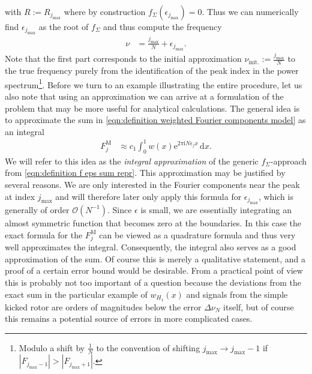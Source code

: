 \documentclass[english, parskip=full]{scrartcl}     %
\newcommand{\intx}{}
\newcommand{\tecxt}{}
\renewcommand{\i}{\text{i}}
\newcommand{\e}{\text{e}}
\begin{document}
with $R := R_{j_\tecxt\text{max}}$ where by construction $f_\Sigma(\epsilon_{j_\tecxt\text{max}}) = 0$. 
Thus we can numerically find $\epsilon_{j_\tecxt\text{max}}$ as the root of $f_\Sigma$ and thus compute the frequency
\begin{align}
\nu &= \frac{j_\tecxt\text{max}}{N} + \epsilon_{j_\tecxt\text{max}}.
\end{align}
Note that the first part corresponds to the initial approximation $\nu_\tecxt\text{init.} := \frac{j_\tecxt\text{max}}{N}$ to the true frequency purely from the identification of the peak index in the power spectrum\footnote{Modulo a shift by $\frac{1}{N}$ to the convention of shifting $j_\tecxt\text{max} \rightarrow j_\tecxt\text{max} - 1$ if $|F_{j_\tecxt\text{max} - 1}| > |F_{j_\tecxt\text{max} + 1}|$.}.
Before we turn to an example illustrating the entire procedure, let us also note that using an approximation we can arrive at a formulation of the problem that may be more useful for analytical calculations.
The general idea is to approximate the sum in \autoref{eqn:definition weighted Fourier components model} as an integral
\begin{align}
F_j^\tecxt\text{M} &\approx c_1 \intx\int_{0}^{1} w(x) \e^{2\pi\i N\epsilon_j x} \, \mathrm{d}x. \label{eqn:definition weighted Fourier components model integral approx}
\end{align}
We will refer to this idea as the \emph{integral approximation} of the generic $f_\Sigma$-approach from \autoref{eqn:definition f eps sum repr}.
This approximation may be justified by several reasons.
We are only interested in the Fourier components near the peak at index $j_\tecxt\text{max}$ and will therefore later only apply this formula for $\epsilon_{j_\tecxt\text{max}}$, which is generally of order $\mathcal{O}(N^{-1})$.
Since $\epsilon$ is small, we are essentially integrating an almost symmetric function that becomes zero at the boundaries.
In this case the exact formula for the $F_j^\tecxt\text{M}$ can be viewed as a quadrature formula and thus very well approximates the integral.
Consequently, the integral also serves as a good approximation of the sum.
Of course this is merely a qualitative statement, and a proof of a certain error bound would be desirable.
From a practical point of view this is probably not too important of a question because the deviations from the exact sum in the particular example of $w_{H_1}(x)$ and signals from the simple kicked rotor are orders of magnitudes below the error $\Delta\nu_N$ itself, but of course this remains a potential source of errors in more complicated cases.\\
\end{document}
